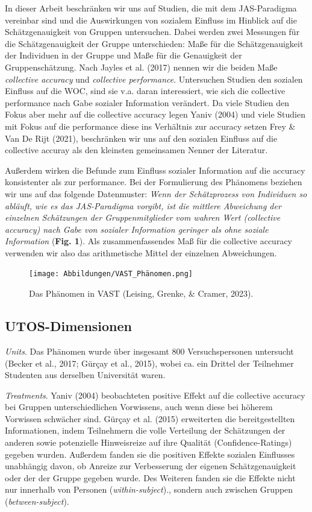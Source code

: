 \documentclass[
  man,mask,floatsintext]{apa6}
\begin{document}
In dieser Arbeit beschränken wir uns auf Studien, die mit dem JAS-Paradigma vereinbar sind und die Auswirkungen von sozialem Einfluss im Hinblick auf die Schätzgenauigkeit von Gruppen untersuchen. Dabei werden zwei Messungen für die Schätzgenauigkeit der Gruppe unterschieden: Maße für die Schätzgenauigkeit der Individuen in der Gruppe und Maße für die Genauigkeit der Gruppenschätzung. Nach Jayles et al. (2017) nennen wir die beiden Maße \emph{collective accuracy} und \emph{collective performance}. Untersuchen Studien den sozialen Einfluss auf die WOC, sind sie v.a. daran interessiert, wie sich die collective performance nach Gabe sozialer Information verändert. Da viele Studien den Fokus aber mehr auf die collective accuracy legen Yaniv (2004) und viele Studien mit Fokus auf die performance diese ins Verhältnis zur accuracy setzen Frey \& Van De Rijt (2021), beschränken wir uns auf den sozialen Einfluss auf die collective accuray als den kleinsten gemeinsamen Nenner der Literatur.

Außerdem wirken die Befunde zum Einfluss sozialer Information auf die accuracy konsistenter als zur performance. Bei der Formulierung des Phänomens beziehen wir uns auf das folgende Datenmuster: \emph{Wenn der Schätzprozess von Individuen so abläuft, wie es das JAS-Paradigma vorgibt, ist die mittlere Abweichung der einzelnen Schätzungen der Gruppenmitglieder vom wahren Wert (collective accuracy) nach Gabe von sozialer Information geringer als ohne soziale Information} (\textbf{Fig. 1}). Als zusammenfassendes Maß für die collective accuracy verwenden wir also das arithmetische Mittel der einzelnen Abweichungen.



\begin{figure}
\centering
\texttt{[image: Abbildungen/VAST\_Phänomen.png]}
\caption{\label{fig:my-figure1}Das Phänomen in VAST (Leising, Grenke, \& Cramer, 2023).}
\end{figure}

\subsection{UTOS-Dimensionen}\label{utos-dimensionen}

\emph{Units}. Das Phänomen wurde über insgesamt 800 Versuchspersonen untersucht (Becker et al., 2017; Gürçay et al., 2015), wobei ca. ein Drittel der Teilnehmer Studenten aus derselben Universität waren.

\emph{Treatments}. Yaniv (2004) beobachteten positive Effekt auf die collective accuracy bei Gruppen unterschiedlichen Vorwissens, auch wenn diese bei höherem Vorwissen schwächer sind. Gürçay et al. (2015) erweiterten die bereitgestellten Informationen, indem Teilnehmern die volle Verteilung der Schätzungen der anderen sowie potenzielle Hinweisreize auf ihre Qualität (Confidence-Ratings) gegeben wurden. Außerdem fanden sie die positiven Effekte sozialen Einflusses unabhängig davon, ob Anreize zur Verbesserung der eigenen Schätzgenauigkeit oder der der Gruppe gegeben wurde. Des Weiteren fanden sie die Effekte nicht nur innerhalb von Personen (\emph{within-subject})., sondern auch zwischen Gruppen (\emph{between-subject}).
\end{document}
